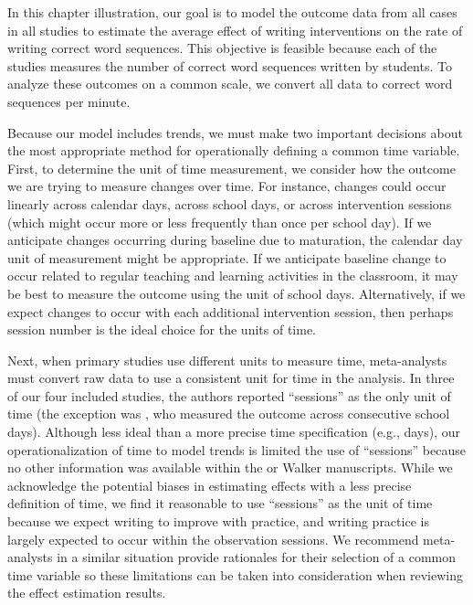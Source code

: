 \documentclass[
]{book}
\begin{document}
In this chapter illustration, our goal is to model the outcome data from all cases in all studies to estimate the average effect of writing interventions on the rate of writing correct word sequences. This objective is feasible because each of the studies measures the number of correct word sequences written by students. To analyze these outcomes on a common scale, we convert all data to correct word sequences per minute.

Because our model includes trends, we must make two important decisions about the most appropriate method for operationally defining a common time variable. First, to determine the unit of time measurement, we consider how the outcome we are trying to measure changes over time. For instance, changes could occur linearly across calendar days, across school days, or across intervention sessions (which might occur more or less frequently than once per school day). If we anticipate changes occurring during baseline due to maturation, the calendar day unit of measurement might be appropriate. If we anticipate baseline change to occur related to regular teaching and learning activities in the classroom, it may be best to measure the outcome using the unit of school days. Alternatively, if we expect changes to occur with each additional intervention session, then perhaps session number is the ideal choice for the units of time.

Next, when primary studies use different units to measure time, meta-analysts must convert raw data to use a consistent unit for time in the analysis. In three of our four included studies, the authors reported ``sessions'' as the only unit of time (the exception was \citet{stotz2008Effects}, who measured the outcome across consecutive school days). Although less ideal than a more precise time specification (e.g., days), our operationalization of time to model trends is limited the use of ``sessions'' because no other information was available within the \citet{lewandowski2011effects} or Walker \citetext{\citeyear{walker2005using}; \citeyear{walker2007improving}} manuscripts. While we acknowledge the potential biases in estimating effects with a less precise definition of time, we find it reasonable to use ``sessions'' as the unit of time because we expect writing to improve with practice, and writing practice is largely expected to occur within the observation sessions. We recommend meta-analysts in a similar situation provide rationales for their selection of a common time variable so these limitations can be taken into consideration when reviewing the effect estimation results.
\end{document}
